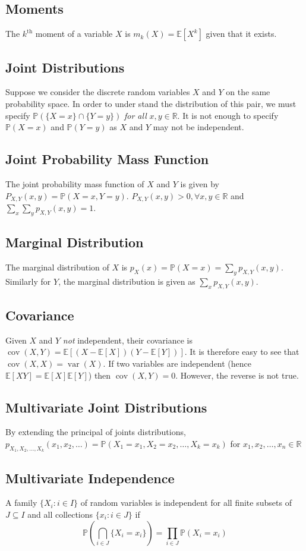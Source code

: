 \documentclass[fontsize=10pt]{article}
\numberwithin{equation}{subsection}
\newcommand{\PP}[1]{\mathbb{P}\left(#1\right)}
\newcommand{\EE}[1]{\mathbb{E}\left[#1\right]}
\newcommand{\setreal}{\mathbb{R}}
\newcommand{\var}{\mathop{\mathrm{var}}}
\newcommand{\cov}{\mathop{\mathrm{cov}}}
\begin{document}
\begin{multicols}{2}
\subsection{Moments}
The $k^\text{th}$ moment of a variable $X$ is $m_k(X)=\EE{X^k}$ given that it exists.
\subsection{Joint Distributions}
Suppose we consider the discrete random variables $X$ and $Y$ on the same probability space. In order to under stand the distribution of this pair, we must specify $\PP{\{X=x\}\cap\{Y=y\}}$ \emph{for all} $x,y\in\setreal$.  It is not enough to specify $\PP{X=x}$ and $\PP{Y=y}$ as $X$ and $Y$ may not be independent.
\subsection{Joint Probability Mass Function}The joint probability mass function of $X$ and $Y$ is given by $P_{X,Y}(x,y)=\PP{X=x,Y=y}$.  $P_{X,Y}(x,y)>0,\forall x,y\in\setreal$ and $\sum_x\sum_yp_{X,Y}(x,y)=1$.
\subsection{Marginal Distribution}The marginal distribution of $X$ is $p_X(x)=\PP{X=x}=\sum_yp_{X,Y}(x,y)$. Similarly for $Y$, the marginal distribution is given as $\sum_xp_{X,Y}(x,y)$.
\subsection{Covariance}Given $X$ and $Y$ \emph{not} independent, their covariance is $\cov(X,Y)=\EE{(X-\EE X)(Y-\EE Y)}$.  It is therefore easy to see that $\cov(X,X)=\var(X)$.  If two variables are independent (hence $\EE{XY}=\EE X\EE Y$) then $\cov(X,Y)=0$.   However, the reverse is not true.
\end{multicols}
\subsection{Multivariate Joint Distributions}By extending the principal of joints distributions, $p_{X_1,X_2,\ldots,X_k}(x_1,x_2,\ldots)=\PP{X_1=x_1,X_2=x_2,\ldots,X_k=x_k}$ for $x_1,x_2,\ldots,x_n\in\setreal$
\subsection{Multivariate Independence}A family $\{X_i:i\in I\}$ of random variables is independent for all finite subsets of $J\subseteq I$ and all collections $\{x_i:i\in J\}$ if \[\PP{\bigcap_{i\in J}\{X_i=x_i\}}=\prod_{i\in J}\PP{X_i=x_i}\]
\end{document}

